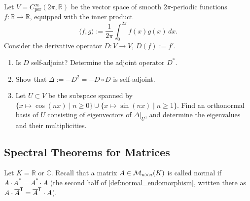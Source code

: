 \begin{exercise}
  \label{exc:differential_operators_fourier}
  Let $V = C^\infty_{\text{per}}(2\pi, \mathbb{R})$ be the vector space of smooth $2\pi$-periodic functions $f \colon \mathbb{R} \to \mathbb{R}$, equipped with the inner product
  \[
  \langle f, g \rangle := \frac{1}{2\pi} \int_0^{2\pi} f(x) g(x) \, dx.
  \]
  Consider the derivative operator $D \colon V \to V$, $D(f) := f'$.
  \begin{enumerate}[label=\textbf{(\alph*)}]
    \item Is $D$ self-adjoint? Determine the adjoint operator $D^*$.
    \item Show that $\Delta := -D^2 = -D \circ D$ is self-adjoint.
    \item Let $U \subset V$ be the subspace spanned by $\{x \mapsto \cos(nx) \mid n \ge 0\} \cup \{x \mapsto \sin(nx) \mid n \ge 1\}$. Find an orthonormal basis of $U$ consisting of eigenvectors of $\Delta|_U$, and determine the eigenvalues and their multiplicities.
  \end{enumerate}
\end{exercise}

\subsection{Spectral Theorems for Matrices}

Let $K = \mathbb{R}$ or $\mathbb{C}$. Recall that a matrix $A \in \mathcal{M}_{n \times n}(K)$ is called normal if $A \cdot A^* = A^* \cdot A$ (the second half of \cref{def:normal_endomorphism}, written there as $A \cdot \overline{A}^{\mathsf{T}} = \overline{A}^{\mathsf{T}} \cdot A$).


